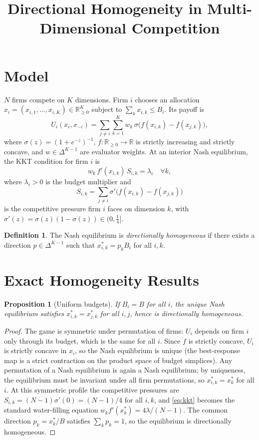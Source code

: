 \documentclass{article}
\title{Directional Homogeneity in Multi-Dimensional Competition}
\date{}
\newtheorem{proposition}{Proposition}
\theoremstyle{definition}
\newtheorem{definition}{Definition}
\begin{document}
\maketitle

\section*{Model}

$N$ firms compete on $K$ dimensions. Firm $i$ chooses an allocation
$x_i = (x_{i,1}, \ldots, x_{i,K}) \in \mathbb{R}_{\geq 0}^K$ subject to
$\sum_k x_{i,k} \leq B_i$. Its payoff is
\[
  U_i(x_i, x_{-i}) = \sum_{j \neq i}\sum_{k=1}^{K} w_k\,
    \sigma\!\bigl(f(x_{i,k}) - f(x_{j,k})\bigr),
\]
where $\sigma(z) = (1+e^{-z})^{-1}$, $f : \mathbb{R}_{\geq 0} \to \mathbb{R}$
is strictly increasing and strictly concave, and $w \in \Delta^{K-1}$ are
evaluator weights.  At an interior Nash equilibrium, the KKT condition for
firm $i$ is
\begin{equation}\label{eq:kkt}
  w_k\,f'(x_{i,k})\,S_{i,k} = \lambda_i \quad \forall k,
\end{equation}
where $\lambda_i > 0$ is the budget multiplier and
\[
  S_{i,k} = \sum_{j \neq i} \sigma'\!\bigl(f(x_{i,k}) - f(x_{j,k})\bigr)
\]
is the competitive pressure firm $i$ faces on dimension $k$, with
$\sigma'(z) = \sigma(z)(1-\sigma(z)) \in (0,\tfrac{1}{4}]$.

\begin{definition}
The Nash equilibrium is \emph{directionally homogeneous} if there exists a
direction $p \in \Delta^{K-1}$ such that $x_{i,k}^* = p_k B_i$ for all $i, k$.
\end{definition}

\section{Exact Homogeneity Results}

\begin{proposition}[Uniform budgets]\label{prop:B}
If $B_i = B$ for all $i$, the unique Nash equilibrium satisfies
$x_{i,k}^* = x_{j,k}^*$ for all $i, j$, hence is directionally homogeneous.
\end{proposition}

\begin{proof}
The game is symmetric under permutation of firms: $U_i$ depends on firm $i$
only through its budget, which is the same for all $i$.  Since $f$ is strictly
concave, $U_i$ is strictly concave in $x_i$, so the Nash equilibrium is unique
(the best-response map is a strict contraction on the product space of budget
simplices).  Any permutation of a Nash equilibrium is again a Nash equilibrium;
by uniqueness, the equilibrium must be invariant under all firm permutations, so
$x_{i,k}^* = x_k^*$ for all $i$.  At this symmetric profile the competitive
pressures are $S_{i,k} = (N-1)\sigma'(0) = (N-1)/4$ for all $i, k$, and
\eqref{eq:kkt} becomes the standard water-filling equation $w_k f'(x_k^*) = 4\lambda/(N-1)$.
The common direction $p_k = x_k^*/B$ satisfies $\sum_k p_k = 1$, so the
equilibrium is directionally homogeneous.
\end{proof}
\end{document}
